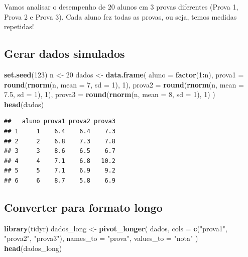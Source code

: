 \documentclass[
]{book}
\newenvironment{Shaded}{\begin{snugshade}}{\end{snugshade}}
\newcommand{\AttributeTok}[1]{\textcolor[rgb]{0.13,0.29,0.53}{#1}}
\newcommand{\DecValTok}[1]{\textcolor[rgb]{0.00,0.00,0.81}{#1}}
\newcommand{\FloatTok}[1]{\textcolor[rgb]{0.00,0.00,0.81}{#1}}
\newcommand{\FunctionTok}[1]{\textcolor[rgb]{0.13,0.29,0.53}{\textbf{#1}}}
\newcommand{\NormalTok}[1]{#1}
\newcommand{\OtherTok}[1]{\textcolor[rgb]{0.56,0.35,0.01}{#1}}
\newcommand{\SpecialCharTok}[1]{\textcolor[rgb]{0.81,0.36,0.00}{\textbf{#1}}}
\newcommand{\StringTok}[1]{\textcolor[rgb]{0.31,0.60,0.02}{#1}}
\begin{document}
Vamos analisar o desempenho de 20 alunos em 3 provas diferentes (Prova 1, Prova 2 e Prova 3). Cada aluno fez todas as provas, ou seja, temos medidas repetidas!

\subsection{Gerar dados simulados}\label{gerar-dados-simulados}

\begin{Shaded}
\begin{Highlighting}[]
\FunctionTok{set.seed}\NormalTok{(}\DecValTok{123}\NormalTok{)}
\NormalTok{n }\OtherTok{\textless{}{-}} \DecValTok{20}
\NormalTok{dados }\OtherTok{\textless{}{-}} \FunctionTok{data.frame}\NormalTok{(}
  \AttributeTok{aluno =} \FunctionTok{factor}\NormalTok{(}\DecValTok{1}\SpecialCharTok{:}\NormalTok{n),}
  \AttributeTok{prova1 =} \FunctionTok{round}\NormalTok{(}\FunctionTok{rnorm}\NormalTok{(n, }\AttributeTok{mean =} \DecValTok{7}\NormalTok{, }\AttributeTok{sd =} \DecValTok{1}\NormalTok{), }\DecValTok{1}\NormalTok{),}
  \AttributeTok{prova2 =} \FunctionTok{round}\NormalTok{(}\FunctionTok{rnorm}\NormalTok{(n, }\AttributeTok{mean =} \FloatTok{7.5}\NormalTok{, }\AttributeTok{sd =} \DecValTok{1}\NormalTok{), }\DecValTok{1}\NormalTok{),}
  \AttributeTok{prova3 =} \FunctionTok{round}\NormalTok{(}\FunctionTok{rnorm}\NormalTok{(n, }\AttributeTok{mean =} \DecValTok{8}\NormalTok{, }\AttributeTok{sd =} \DecValTok{1}\NormalTok{), }\DecValTok{1}\NormalTok{)}
\NormalTok{)}
\FunctionTok{head}\NormalTok{(dados)}
\end{Highlighting}
\end{Shaded}

\begin{verbatim}
##   aluno prova1 prova2 prova3
## 1     1    6.4    6.4    7.3
## 2     2    6.8    7.3    7.8
## 3     3    8.6    6.5    6.7
## 4     4    7.1    6.8   10.2
## 5     5    7.1    6.9    9.2
## 6     6    8.7    5.8    6.9
\end{verbatim}

\subsection{Converter para formato longo}\label{converter-para-formato-longo}

\begin{Shaded}
\begin{Highlighting}[]
\FunctionTok{library}\NormalTok{(tidyr)}
\NormalTok{dados\_long }\OtherTok{\textless{}{-}} \FunctionTok{pivot\_longer}\NormalTok{(}
\NormalTok{  dados,}
  \AttributeTok{cols =} \FunctionTok{c}\NormalTok{(}\StringTok{"prova1"}\NormalTok{, }\StringTok{"prova2"}\NormalTok{, }\StringTok{"prova3"}\NormalTok{),}
  \AttributeTok{names\_to =} \StringTok{"prova"}\NormalTok{,}
  \AttributeTok{values\_to =} \StringTok{"nota"}
\NormalTok{)}
\FunctionTok{head}\NormalTok{(dados\_long)}
\end{Highlighting}
\end{Shaded}
\end{document}
